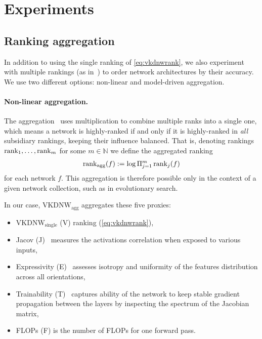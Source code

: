 \section{Experiments}
\label{sec:experiments}


\subsection{Ranking aggregation}
\label{subsec:ranking}


In addition to using the single ranking of \cref{eq:vkdnwrank}, we also experiment with multiple rankings  (as in~\cite{li2023zico, lee2024az, kadlecova2024surprisingly}) to order network architectures by their accuracy. We use two different options: non-linear and model-driven aggregation.

\paragraph{Non-linear aggregation.} The aggregation~\cite{lee2024az} uses multiplication to combine multiple ranks into a single one, which means a network is highly-ranked if and only if it is highly-ranked in \textit{all} subsidiary rankings, keeping their influence balanced. That is, denoting rankings $\operatorname{rank}_1,\dots, \operatorname{rank}_m$ for some $m\in\mathbb{N}$ we define the aggregated ranking
\begin{align}
    \operatorname{rank}_{\operatorname{agg}}(f):=\log{\Pi_{j=1}^m\operatorname{rank}_j(f)}
\end{align}
for each network $f$. This aggregation is therefore possible only in the context of a given network collection, such as in evolutionary search. 

In our case, $\text{VKDNW}_{\text{agg}}$ aggregates these five proxies:
\begin{itemize}
    \item $\text{VKDNW}_{\text{single}}$ (V) ranking (\cref{eq:vkdnwrank}),
    \item Jacov (J)~\cite{abdelfattah2021zero} measures the activations correlation when exposed to various inputs, %
    \item Expressivity (E)~\cite{lee2024az} assesses isotropy and uniformity of the features distribution across all orientations, %
    \item Trainability (T)~\cite{lee2024az} captures ability of the network to keep stable gradient propagation between the layers by inspecting the spectrum of the Jacobian matrix,
    \item FLOPs (F) is the number of FLOPs for one forward pass.
\end{itemize}

